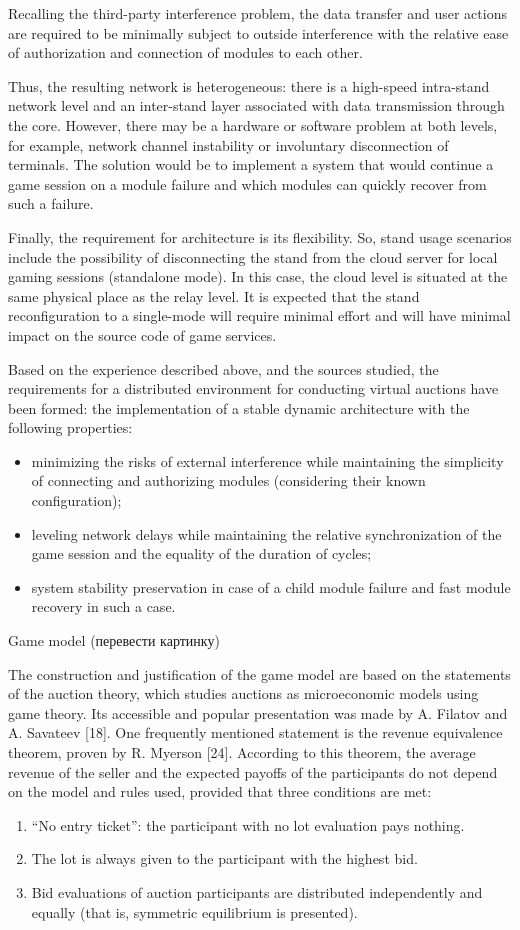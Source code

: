 \documentclass[
]{ceurart}
\begin{document}
Recalling the third-party interference problem, the data transfer and user actions are required to be minimally subject to outside interference with the relative ease of authorization and connection of modules to each other.

Thus, the resulting network is heterogeneous: there is a high-speed intra-stand network level and an inter-stand layer associated with data transmission through the core. However, there may be a hardware or software problem at both levels, for example, network channel instability or involuntary disconnection of terminals. The solution would be to implement a system that would continue a game session on a module failure and which modules can quickly recover from such a failure.

Finally, the requirement for architecture is its flexibility. So, stand usage scenarios include the possibility of disconnecting the stand from the cloud server for local gaming sessions (standalone mode). In this case, the cloud level is situated at the same physical place as the relay level. It is expected that the stand reconfiguration to a single-mode will require minimal effort and will have minimal impact on the source code of game services.

Based on the experience described above, and the sources studied, the requirements for a distributed environment for conducting virtual auctions have been formed: the implementation of a stable dynamic architecture with the following properties:
\begin{itemize}
\item minimizing the risks of external interference while maintaining the simplicity of connecting and authorizing modules (considering their known configuration);
\item leveling network delays while maintaining the relative synchronization of the game session and the equality of the duration of cycles;
\item system stability preservation in case of a child module failure and fast module recovery in such a case.
\end{itemize}

Game model (перевести картинку)

The construction and justification of the game model are based on the statements of the auction theory, which studies auctions as microeconomic models using game theory. Its accessible and popular presentation was made by A. Filatov and A. Savateev [18]. One frequently mentioned statement is the revenue equivalence theorem, proven by R. Myerson [24]. According to this theorem, the average revenue of the seller and the expected payoffs of the participants do not depend on the model and rules used, provided that three conditions are met:
\begin{enumerate}
\item ``No entry ticket'': the participant with no lot evaluation pays nothing.
\item The lot is always given to the participant with the highest bid.
\item Bid evaluations of auction participants are distributed independently and equally (that is, symmetric equilibrium is presented).
\end{enumerate}
\end{document}
